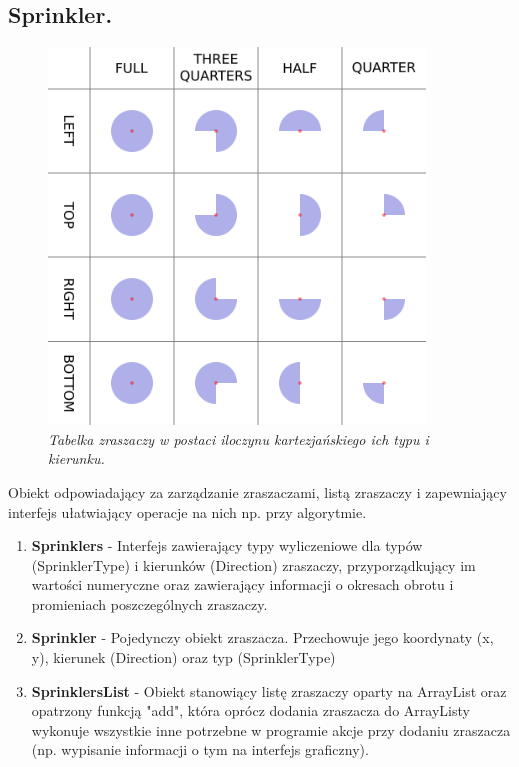 \documentclass[a4paper]{article}
\begin{document}
\subsection{Sprinkler.}
\begin{figure}[H]
        \includegraphics[width=10cm]{sprinklers.png}
        \centering
        \caption{\textit{Tabelka zraszaczy w postaci iloczynu kartezjańskiego ich typu i kierunku.}}
\end{figure}
Obiekt odpowiadający za zarządzanie zraszaczami, listą zraszaczy i zapewniający interfejs ułatwiający operacje na nich np. przy algorytmie.
\begin{enumerate}
    \item \textbf{Sprinklers} - Interfejs zawierający typy wyliczeniowe dla typów (SprinklerType) i kierunków (Direction) zraszaczy, przyporządkujący im wartości numeryczne oraz zawierający informacji o okresach obrotu i promieniach poszczególnych zraszaczy. 
	\item \textbf{Sprinkler} - Pojedynczy obiekt zraszacza. Przechowuje jego koordynaty (x, y), kierunek (Direction) oraz typ (SprinklerType)
	\item \textbf{SprinklersList} - Obiekt stanowiący listę zraszaczy oparty na ArrayList oraz opatrzony funkcją "add", która oprócz dodania zraszacza do ArrayListy wykonuje wszystkie inne potrzebne w programie akcje przy dodaniu zraszacza (np. wypisanie informacji o tym na interfejs graficzny). 
\end{enumerate}
\end{document}
